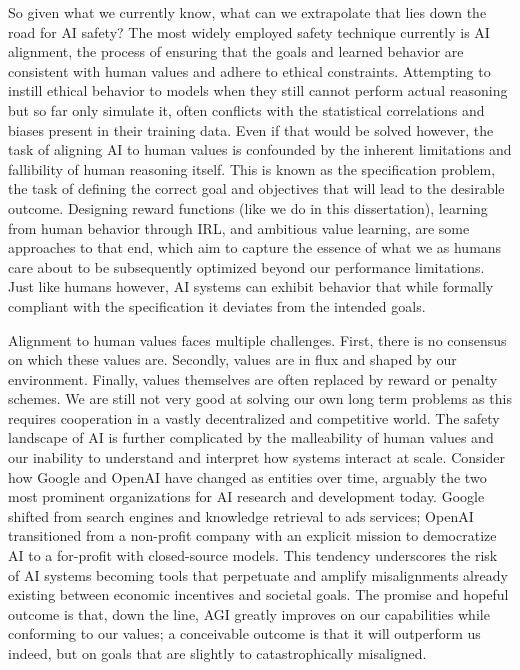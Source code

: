 So given what we currently know, what can we extrapolate that lies down the road for \gls{AI} safety?
The most widely employed safety technique currently is \gls{AI} alignment, the process of ensuring that the goals and learned behavior are consistent with human values and adhere to ethical constraints.
Attempting to instill ethical behavior to models when they still cannot perform actual reasoning but so far only simulate it, often conflicts with the statistical correlations and biases present in their training data.
Even if that would be solved however, the task of aligning \gls{AI} to human values is confounded by the inherent limitations and fallibility of human reasoning itself.
This is known as the specification problem, the task of defining the correct goal and objectives that will lead to the desirable outcome.
Designing reward functions (like we do in this dissertation), learning from human behavior through \gls{IRL}, and ambitious value learning, are some approaches to that end, which aim to capture the essence of what we as humans care about to be subsequently optimized beyond our performance limitations.
Just like humans however, AI systems can exhibit behavior that while formally compliant with the specification it deviates from the intended goals. 

Alignment to human values faces multiple challenges.
First, there is no consensus on which these values are.
Secondly, values are in flux and shaped by our environment.
Finally, values themselves are often replaced by reward or penalty schemes.
We are still not very good at solving our own long term problems as this requires cooperation in a vastly decentralized and competitive world.
The safety landscape of \gls{AI} is further complicated by the malleability of human values and our inability to understand and interpret how systems interact at scale.
Consider how Google and OpenAI have changed as entities over time, arguably the two most prominent organizations for \gls{AI} research and development today.
Google shifted from search engines and knowledge retrieval to ads services; OpenAI transitioned from a non-profit company with an explicit mission to democratize \gls{AI} to a for-profit with closed-source models.
This tendency underscores the risk of AI systems becoming tools that perpetuate and amplify misalignments already existing between economic incentives and societal goals.
The promise and hopeful outcome is that, down the line, \gls{AGI} greatly improves on our capabilities while conforming to our values; a conceivable outcome is that it will outperform us indeed, but on goals that are slightly to catastrophically misaligned.

